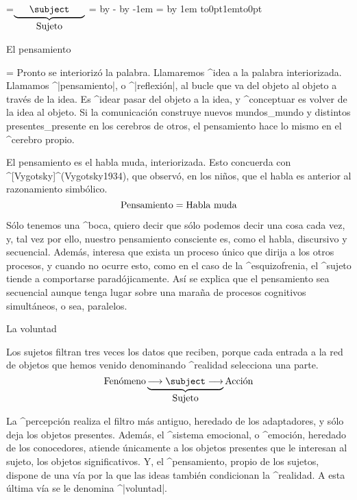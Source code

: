 =\hbox{$\underbrace{\phantom{\longrightarrow}%
   \subject
   \phantom{\longrightarrow}}_{\hbox{Sujeto}}$}
=\hsize \advance{} by - \advance{} by -1em
= \advance{} by 1em
\nointerlineskip
\hbox to0pt{\kern{}\kern1em\vbox to0pt{\kern2pc\vss}\hss}
\nointerlineskip


\Section El pensamiento

\begingroup\rightskip=
Pronto se interiorizó la palabra. Llamaremos ^{idea} a la palabra
interiorizada. Llamamos ^|pensamiento|, o ^|reflexión|, al bucle que va
del objeto al objeto a través de la idea. Es ^{idear} pasar del objeto a
la idea, y ^{conceptuar} es volver de la idea al objeto. Si la
comunicación construye nuevos mundos_{mundo} y distintos
presentes_{presente} en los cerebros de otros, el pensamiento hace lo
mismo en el ^{cerebro} propio.
\par\endgroup


El pensamiento es el habla muda, interiorizada. Esto concuerda con
^[Vygotsky]^(Vygotsky1934), que observó, en los niños, que el habla es
anterior al razonamiento simbólico.
$$\hbox{Pensamiento} = \hbox{Habla muda}$$

Sólo tenemos una ^{boca}, quiero decir que sólo podemos decir una cosa
cada vez, y, tal vez por ello, nuestro pensamiento consciente es, como
el habla, discursivo y secuencial. Además, interesa que exista un
proceso único que dirija a los otros procesos, y cuando no ocurre esto,
como en el caso de la ^{esquizofrenia}, el ^{sujeto} tiende a
comportarse paradójicamente. Así se explica que el pensamiento sea
secuencial aunque tenga lugar sobre una maraña de procesos cognitivos
simultáneos, o sea, paralelos.


\Section La voluntad

Los sujetos filtran tres veces los datos que reciben, porque cada
entrada a la red de objetos que hemos venido denominando ^{realidad}
selecciona una parte.
$$\hbox{Fenómeno}
  \underbrace{\longrightarrow\subject
   \longrightarrow}_{\hbox{Sujeto}}
  \hbox{Acción}
\abovedisplayskip=\abovedisplayshortskip
\belowdisplayskip=\belowdisplayshortskip
$$

La ^{percepción} realiza el filtro más antiguo, heredado de los
adaptadores, y sólo deja los objetos presentes. Además, el ^{sistema
emocional}, o ^{emoción}, heredado de los conocedores, atiende
únicamente a los objetos presentes que le interesan al sujeto, los
objetos significativos. Y, el ^{pensamiento}, propio de los sujetos,
dispone de una vía por la que las ideas también condicionan la
^{realidad}. A esta última vía se le denomina ^|voluntad|.

